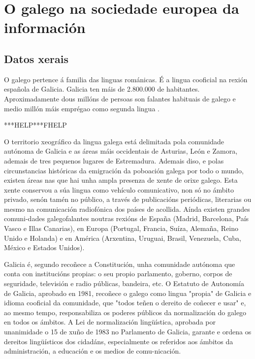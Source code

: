     

\clearpage


\section{O galego na sociedade europea da información}

\begin{multicols}{2}

\subsection{Datos xerais}

    O galego pertence á familia das linguas románicas. É a lingua cooficial na rexión española de Galicia. Galicia ten máis de 2.800.000 de habitantes. Aproximadamente dous millóns de persoas son falantes habituais de galego e medio millón máis emprégao como segunda lingua \cite{GAL-Nota5,GAL-Nota6}.

***HELP***FHELP

O territorio xeográfico da lingua galega está delimitada pola comunidade autónoma de Galicia e as áreas máis occidentais de Asturias, León e Zamora, ademais de tres pequenos lugares de Estremadura. Ademais diso, e polas circunstancias históricas da emigración da poboación galega por todo o mundo, existen áreas nas que hai unha ampla presenza de xente de orixe galego. Esta xente conservou a súa lingua como vehículo comunicativo, non só no ámbito privado, senón tamén no público, a través de publicacións periódicas, literarias ou mesmo na comunicación radiofónica dos países de acollida. Aínda existen grandes comuni-dades galegofalantes noutras rexións de España (Madrid, Barcelona, País Vasco e Illas Canarias), en Europa (Portugal, Francia, Suíza, Alemaña, Reino Unido e Holanda) e en América (Arxentina, Uruguai, Brasil, Venezuela, Cuba, México e Estados Unidos).
 
Galicia é, segundo recoñece a Constitución, unha comunidade autónoma que conta con institucións propias: o seu propio parlamento, goberno, corpos de seguridade, televisión e radio públicas, bandeira, etc. O Estatuto de Autonomía de Galicia, aprobado en 1981, recoñece o galego como lingua "propia" de Galicia e idioma cooficial da comunidade, que "todos teñen o dereito de coñecer e usar" e, ao mesmo tempo, responsabiliza os poderes públicos da normalización do galego en todos os ámbitos. A Lei de normalización lingüística, aprobada por unanimidade o 15 de xuño de 1983 no Parlamento de Galicia, garante e ordena os dereitos lingüísticos dos cidadáns, especialmente os referidos aos ámbitos da administración, a educación e os medios de comu-nicación. 


\end{multicols}
